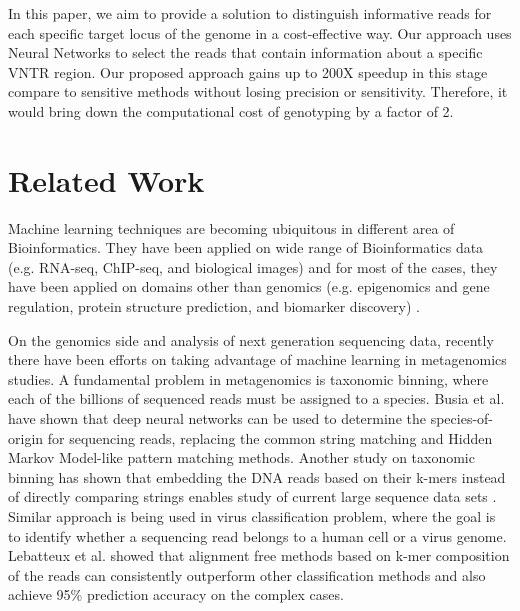 In this paper, we aim to provide a solution to distinguish informative reads for each specific target locus of the genome in a cost-effective way. Our approach uses Neural Networks to select the reads that contain information about a specific VNTR region. Our proposed approach gains up to 200X speedup in this stage compare to sensitive methods without losing precision or sensitivity. Therefore, it would bring down the computational cost of genotyping by a factor of 2.

\section{Related Work}
Machine learning techniques are becoming ubiquitous in different area of Bioinformatics. They have been applied on wide range of Bioinformatics data (e.g. RNA-seq, ChIP-seq, and biological images) and for most of the cases, they have been applied on domains other than genomics (e.g. epigenomics and gene regulation, protein structure prediction, and biomarker discovery) \cite{Min2017deep, Angermueller2016, Ching2018, Zitnik2019}.

On the genomics side and analysis of next generation sequencing data, recently there have been efforts on taking advantage of machine learning in metagenomics studies. 
A fundamental problem in metagenomics is taxonomic binning, where each of the billions of sequenced reads must be assigned to a species. Busia et al.  have shown that deep neural networks can be used to determine the species-of-origin for sequencing reads, replacing the common string matching and Hidden Markov Model-like pattern matching methods. Another study on taxonomic binning has shown that embedding the DNA reads based on their k-mers instead of directly comparing strings enables study of current large sequence data sets \cite{Menegaux2018}.
Similar approach is being used in virus classification problem, where the goal is to identify whether a sequencing read belongs to a human cell or a virus genome. Lebatteux et al.  showed that alignment free methods based on k-mer composition of the reads can consistently outperform other classification methods and also achieve 95\% prediction accuracy on the complex cases.
